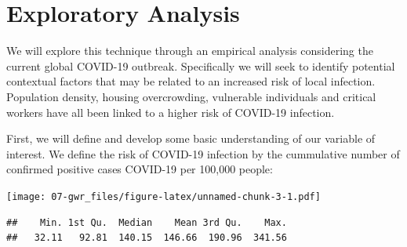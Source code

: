 \documentclass[]{book}
\newenvironment{Shaded}{\begin{snugshade}}{\end{snugshade}}
\newcommand{\KeywordTok}[1]{\textcolor[rgb]{0.13,0.29,0.53}{\textbf{#1}}}
\newcommand{\DataTypeTok}[1]{\textcolor[rgb]{0.13,0.29,0.53}{#1}}
\newcommand{\DecValTok}[1]{\textcolor[rgb]{0.00,0.00,0.81}{#1}}
\newcommand{\FloatTok}[1]{\textcolor[rgb]{0.00,0.00,0.81}{#1}}
\newcommand{\StringTok}[1]{\textcolor[rgb]{0.31,0.60,0.02}{#1}}
\newcommand{\CommentTok}[1]{\textcolor[rgb]{0.56,0.35,0.01}{\textit{#1}}}
\newcommand{\OperatorTok}[1]{\textcolor[rgb]{0.81,0.36,0.00}{\textbf{#1}}}
\newcommand{\NormalTok}[1]{#1}
\begin{document}
\section{Exploratory Analysis}\label{exploratory-analysis}

We will explore this technique through an empirical analysis considering
the current global COVID-19 outbreak. Specifically we will seek to
identify potential contextual factors that may be related to an
increased risk of local infection. Population density, housing
overcrowding, vulnerable individuals and critical workers have all been
linked to a higher risk of COVID-19 infection.

First, we will define and develop some basic understanding of our
variable of interest. We define the risk of COVID-19 infection by the
cummulative number of confirmed positive cases COVID-19 per 100,000
people:

\begin{Shaded}
\end{Shaded}

\texttt{[image: 07-gwr\_files/figure-latex/unnamed-chunk-3-1.pdf]}

\begin{Shaded}
\end{Shaded}

\begin{verbatim}
##    Min. 1st Qu.  Median    Mean 3rd Qu.    Max. 
##   32.11   92.81  140.15  146.66  190.96  341.56
\end{verbatim}
\end{document}
